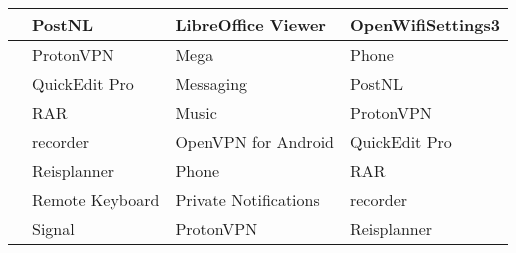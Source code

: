 \begin{table}[]
\begin{tabular}{|l|l|l|l|}
                                                                            & PostNL                                                                           & LibreOffice Viewer                                                          & OpenWifiSettings3                                                               \\ \hline
                                                                            & ProtonVPN                                                                        & Mega                                                                        & Phone                                                                           \\ \hline
                                                                            & QuickEdit Pro                                                                    & Messaging                                                                   & PostNL                                                                          \\ \hline
                                                                            & RAR                                                                              & Music                                                                       & ProtonVPN                                                                       \\ \hline
                                                                            & recorder                                                                         & OpenVPN for Android                                                         & QuickEdit Pro                                                                   \\ \hline
                                                                            & Reisplanner                                                                      & Phone                                                                       & RAR                                                                             \\ \hline
                                                                            & Remote Keyboard                                                                  & Private Notifications                                                       & recorder                                                                        \\ \hline
                                                                            & Signal                                                                           & ProtonVPN                                                                   & Reisplanner                                                                     \\ \hline

\end{tabular}
\end{table}
